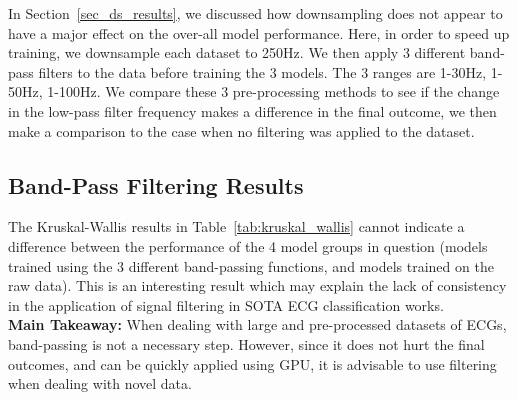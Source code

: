 \documentclass[pmlr,twocolumn]{jmlr}%
\begin{document}
In Section~\ref{sec_ds_results}, we discussed how downsampling does not appear to have a major effect on the over-all model performance. Here, in order to speed up training, we downsample each dataset to 250Hz. We then apply 3 different band-pass filters to the data before training the 3 models. The 3 ranges are 1-30Hz, 1-50Hz, 1-100Hz. We compare these 3 pre-processing methods to see if the change in the low-pass filter frequency makes a difference in the final outcome, we then make a comparison to the case when no filtering was applied to the dataset. 

\subsection{Band-Pass Filtering Results}
The Kruskal-Wallis results in Table~\ref{tab:kruskal_wallis} cannot indicate a difference between the performance of the 4 model groups in question (models trained using the 3 different band-passing functions, and models trained on the raw data). This is an interesting result which may explain the lack of consistency in the application of signal filtering in SOTA ECG classification works.  \\
\textbf{Main Takeaway:} When dealing with large and pre-processed datasets of ECGs, band-passing is not a necessary step. However, since it does not hurt the final outcomes, and can be quickly applied using GPU, it is advisable to use filtering when dealing with novel data.
  
\end{document}
